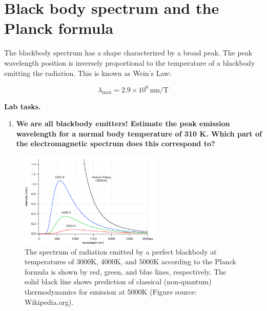 \section{Black body spectrum and the Planck formula}

The blackbody spectrum has a shape characterized by a broad peak. The peak wavelength position is inversely proportional to the temperature of a blackbody emitting the radiation.  This is known as Wein's Law:

\begin{equation}\label{bb:eq:lmax}
\lambda_\textrm{max} = 2.9\times 10^6\,\textrm{nm/T}
\end{equation}

\renewcommand{\theenumi}{\thesection.\arabic{enumi}}


\textbf{Lab tasks.}
 
	\begin{enumerate}
		\item \textbf{We are all blackbody emitters!  Estimate the peak emission wavelength for a normal body temperature of 310 K.  Which part of the electromagnetic spectrum does this correspond to?}
	\end{enumerate}


\begin{figure}[htb]
	\begin{center}
		\includegraphics[angle=0,width=0.6\textwidth]{blackbody/planck01.jpg}
		\caption{\label{bb:fig:planck}
			The spectrum of radiation emitted by a perfect blackbody at temperatures of 3000K, 4000K, and 5000K according to the Planck formula is shown by red, green, and blue lines, respectively. The solid black line shows prediction of classical (non-quantum) thermodynamics for emission at 5000K
			(Figure source: Wikipedia.org).}
	\end{center}
\end{figure}

